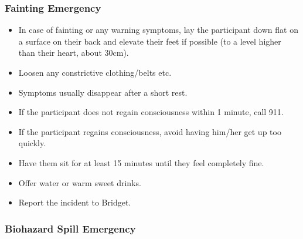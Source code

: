 \documentclass[]{book}
\providecommand{\tightlist}{%
  \setlength{\itemsep}{0pt}\setlength{\parskip}{0pt}}
\begin{document}
\hypertarget{fainting-emergency}{%
\subsubsection{Fainting Emergency}\label{fainting-emergency}}

\begin{itemize}
\tightlist
\item
  In case of fainting or any warning symptoms, lay the participant down flat on a surface on their back and elevate their feet if possible (to a level higher than their heart, about 30cm).
\item
  Loosen any constrictive clothing/belts etc.
\item
  Symptoms usually disappear after a short rest.
\item
  If the participant does not regain consciousness within 1 minute, call 911.
\item
  If the participant regains consciousness, avoid having him/her get up too quickly.
\item
  Have them sit for at least 15 minutes until they feel completely fine.
\item
  Offer water or warm sweet drinks.
\item
  Report the incident to Bridget.
\end{itemize}

\hypertarget{biohazard-spill-emergency}{%
\subsubsection{Biohazard Spill Emergency}\label{biohazard-spill-emergency}}
\end{document}
